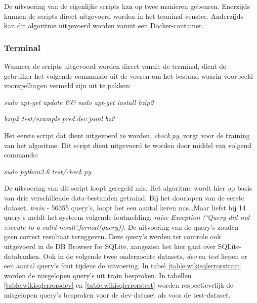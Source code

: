 De uitvoering van de eigenlijke scripts kan op twee manieren gebeuren. Enerzijds kunnen de scripts direct uitgevoerd worden in het terminal-venster. Anderzijds kan dit algoritme uitgevoerd worden vanuit een Docker-container.

\subsubsection{Terminal}

Wanneer de scripts uitgevoerd worden direct vanuit de terminal, dient de gebruiker het volgende commando uit de voeren om het bestand waarin voorbeeld voorspellingen vermeld zijn uit te pakken:
\begin{center}
	\textit{sudo apt-get update \&\& sudo apt-get install bzip2}
\end{center}
\begin{center}
	\textit{bzip2 test/example.pred.dev.jsonl.bz2}
\end{center}

Het eerste script dat dient uitgevoerd te worden, \textit{check.py}, zorgt voor de training van het algoritme. Dit script dient uitgevoerd te worden door middel van volgend commando:
\begin{center}
	\textit{sudo python3.6 test/check.py}
\end{center}

De uitvoering van dit script loopt geregeld mis. Het algoritme wordt hier op basis van drie verschillende data-bestanden getraind. Bij het doorlopen van de eerste dataset, \textit{train} - 56355 query's, loopt het een aantal keren mis\dots Maar liefst bij 14 query's meldt het systeem volgende foutmelding: \textit{raise Exception (‘Query {} did not execute to a valid result’.format(query))}. De uitvoering van de query's zouden geen correct resultaat teruggeven. Deze query's werden ter controle ook uitgevoerd in de DB Browser for SQLite, aangezien het hier gaat over SQLite-databanken. Ook in de volgende twee onderzochte datasets, \textit{dev} en \textit{test} liepen er een aantal query's fout tijdens de uitvoering. In tabel \ref{table:wikisqlerrorstrain} worden de misgelopen query's uit train besproken. In tabellen \ref{table:wikisqlerrorsdev} en \ref{table:wikisqlerrorstest} worden respectievelijk de misgelopen query's besproken voor de dev-dataset als voor de test-dataset.


